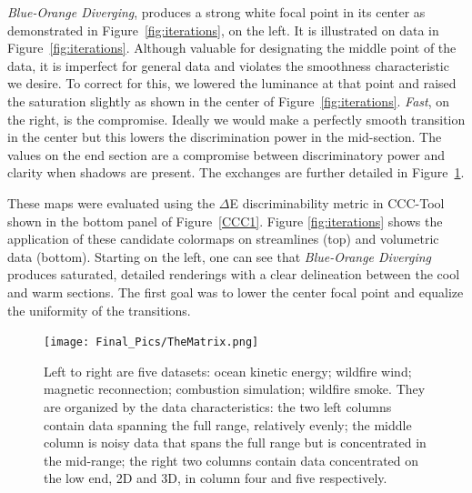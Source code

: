 \documentclass{IEEEcsmag}
\newcommand*{\colormap}[1]{\textsl{#1}\xspace}
\newcommand*{\blueorange}{\colormap{Blue-Orange Diverging}}
\newcommand*{\fast}{\colormap{Fast}}
\begin{document}


\blueorange, produces a strong white focal point in its center as demonstrated in Figure~\ref{fig:iterations}, on the left. %
It is illustrated on data in Figure~\ref{fig:iterations}.
Although valuable for designating the middle point of the data, it is imperfect for general data and violates the smoothness characteristic we desire.
To correct for this, we lowered the luminance at that point and raised the saturation slightly as shown in the center of Figure~\ref{fig:iterations}.
\fast, on the right, is the compromise.
Ideally we would make a perfectly smooth transition in the center but this lowers the discrimination power in the mid-section.
The values on the end section are a compromise between discriminatory power and clarity when shadows are present.
The exchanges are further detailed in Figure~\ref{fig:Matrix}.





These maps were evaluated using the $\Delta$E discriminability metric in CCC-Tool shown in the bottom panel of Figure~\ref{CCC1}. Figure \ref{fig:iterations} shows the application of these candidate colormaps on streamlines (top) and volumetric data (bottom).
Starting on the left, one can see that \blueorange produces saturated, detailed renderings with a clear delineation between the cool and warm sections.
The first goal was to lower the center focal point and equalize the uniformity of the transitions.

\begin{figure}[t]
\centering
\texttt{[image: Final\_Pics/TheMatrix.png]}
\caption{Left to right are five datasets: ocean kinetic energy; wildfire wind; magnetic reconnection; combustion simulation; wildfire smoke. They are organized by the data characteristics: the two left columns contain data spanning the full range, relatively evenly; the middle column is noisy data that spans the full range but is concentrated in the mid-range; the right two columns contain data concentrated on the low end, 2D and 3D, in column four and five respectively. }
\label{fig:Matrix}
\end{figure}
\end{document}
